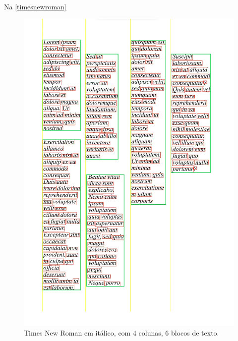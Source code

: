 \documentclass[english, 
               brazil, 
               bsc] %
               {dcomp-abntex2}
\begin{document}
Na \autoref{timesnewroman}
\begin{figure}[h]
        \caption{\label{timesnewroman} \small Times New Roman em itálico, com 4 colunas, 6 blocos de texto.}
        \begin{center}
            \includegraphics[scale=0.5]{./images/times_new_roman_italic_columns.png}
        \end{center}
\end{figure}
\end{document}
